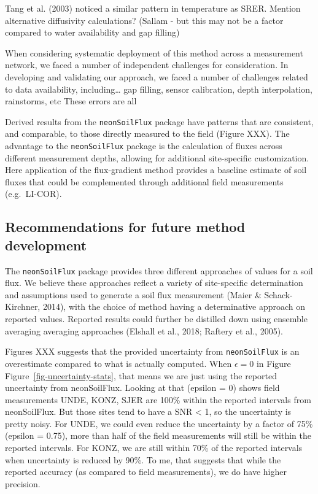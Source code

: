 \documentclass[
  letterpaper,
  DIV=11,
  numbers=noendperiod]{scrartcl}
\begin{document}
Tang et al. (2003) noticed a similar pattern in temperature as SRER.
Mention alternative diffusivity calculations? (Sallam - but this may not
be a factor compared to water availability and gap filling)

When considering systematic deployment of this method across a
measurement network, we faced a number of independent challenges for
consideration. In developing and validating our approach, we faced a
number of challenges related to data availability, including\ldots{} gap
filling, sensor calibration, depth interpolation, rainstorms, etc These
errors are all

Derived results from the \texttt{neonSoilFlux} package have patterns
that are consistent, and comparable, to those directly measured to the
field (Figure XXX). The advantage to the \texttt{neonSoilFlux} package
is the calculation of fluxes across different measurement depths,
allowing for additional site-specific customization. Here application of
the flux-gradient method provides a baseline estimate of soil fluxes
that could be complemented through additional field measurements
(e.g.~LI-COR).

\subsection{Recommendations for future method
development}\label{recommendations-for-future-method-development}

The \texttt{neonSoilFlux} package provides three different approaches of
values for a soil flux. We believe these approaches reflect a variety of
site-specific determination and assumptions used to generate a soil flux
measurement (Maier \& Schack-Kirchner, 2014), with the choice of method
having a determinative approach on reported values. Reported results
could further be distilled down using ensemble averaging averaging
approaches (Elshall et al., 2018; Raftery et al., 2005).

Figures XXX suggests that the provided uncertainty from
\texttt{neonSoilFlux} is an overestimate compared to what is actually
computed. When \(\epsilon=0\) in Figure
Figure~\ref{fig-uncertainty-stats}, that means we are just using the
reported uncertainty from neonSoilFlux. Looking at that (epsilon = 0)
shows field measurements UNDE, KONZ, SJER are 100\% within the reported
intervals from neonSoilFlux. But those sites tend to have a SNR
\textless{} 1, so the uncertainty is pretty noisy. For UNDE, we could
even reduce the uncertainty by a factor of 75\% (epsilon = 0.75), more
than half of the field measurements will still be within the reported
intervals. For KONZ, we are still within 70\% of the reported intervals
when uncertainty is reduced by 90\%. To me, that suggests that while the
reported accuracy (as compared to field measurements), we do have higher
precision.
\end{document}
